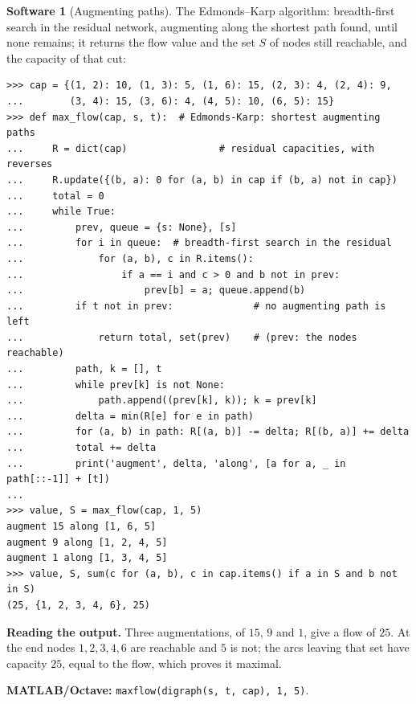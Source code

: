\documentclass[11pt,a4paper]{article}
\numberwithin{equation}{section}
\theoremstyle{definition}
\newtheorem{software}[thm]{Software}
\begin{document}
\begin{software}[Augmenting paths]
\label{sw:maxflow}
The Edmonds--Karp algorithm: breadth-first search in the residual network, augmenting along the shortest path found, until none remains; it returns the flow value and the set $S$ of nodes still reachable, and the capacity of that cut:
{\small\begin{verbatim}
>>> cap = {(1, 2): 10, (1, 3): 5, (1, 6): 15, (2, 3): 4, (2, 4): 9,
...        (3, 4): 15, (3, 6): 4, (4, 5): 10, (6, 5): 15}
>>> def max_flow(cap, s, t):  # Edmonds-Karp: shortest augmenting paths
...     R = dict(cap)                # residual capacities, with reverses
...     R.update({(b, a): 0 for (a, b) in cap if (b, a) not in cap})
...     total = 0
...     while True:
...         prev, queue = {s: None}, [s]
...         for i in queue:  # breadth-first search in the residual
...             for (a, b), c in R.items():
...                 if a == i and c > 0 and b not in prev:
...                     prev[b] = a; queue.append(b)
...         if t not in prev:              # no augmenting path is left
...             return total, set(prev)    # (prev: the nodes reachable)
...         path, k = [], t
...         while prev[k] is not None:
...             path.append((prev[k], k)); k = prev[k]
...         delta = min(R[e] for e in path)
...         for (a, b) in path: R[(a, b)] -= delta; R[(b, a)] += delta
...         total += delta
...         print('augment', delta, 'along', [a for a, _ in path[::-1]] + [t])
...
>>> value, S = max_flow(cap, 1, 5)
augment 15 along [1, 6, 5]
augment 9 along [1, 2, 4, 5]
augment 1 along [1, 3, 4, 5]
>>> value, S, sum(c for (a, b), c in cap.items() if a in S and b not in S)
(25, {1, 2, 3, 4, 6}, 25)
\end{verbatim}}
\textbf{Reading the output.} Three augmentations, of $15$, $9$ and $1$, give a flow of $25$. At the end nodes $1, 2, 3, 4, 6$ are reachable and $5$ is not; the arcs leaving that set have capacity $25$, equal to the flow, which proves it maximal.

\textbf{MATLAB/Octave:} \texttt{maxflow(digraph(s, t, cap), 1, 5)}.
\end{software}
\end{document}
